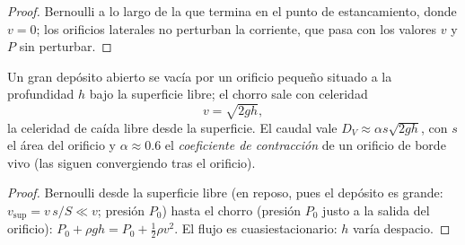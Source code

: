 \begin{proof}
Bernoulli a lo largo de la  que termina en el punto de
estancamiento, donde $v = 0$; los orificios laterales no perturban la
corriente, que pasa con los valores $v$ y $P$ sin perturbar.
\end{proof}

\begin{proposition}\label{prop:b2:euler-bernoulli:torricelli}
Un gran depósito abierto se vacía por un orificio pequeño situado a la
profundidad $h$ bajo la superficie libre; el chorro sale con celeridad
\[
v = \sqrt{2gh} ,
\]
la celeridad de caída libre desde la superficie. El caudal vale $D_V \approx
\alpha s\sqrt{2gh}$, con $s$ el área del orificio y $\alpha \approx 0.6$ el
\emph{coeficiente de contracción} de un orificio de borde vivo (las  siguen convergiendo tras el orificio).
\end{proposition}

\begin{proof}
Bernoulli desde la superficie libre (en reposo, pues el depósito es
grande: $v_{\text{sup}} = v\,s/S \ll v$; presión $P_0$) hasta el chorro (presión $P_0$
justo a la salida del orificio): $P_0 + \rho gh = P_0 + \tfrac12\rho v^2$. El flujo
es cuasiestacionario: $h$ varía despacio.
\end{proof}

